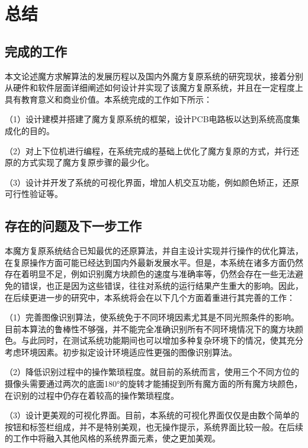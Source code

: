 
\chapter{总结}

\section{完成的工作}

本文论述魔方求解算法的发展历程以及国内外魔方复原系统的研究现状，接着分别从硬件和软件层面详细阐述如何设计并实现了该魔方复原系统，并且在一定程度上具有教育意义和商业价值。本系统完成的工作如下所示：

（1）设计建模并搭建了魔方复原系统的框架，设计PCB电路板以达到系统高度集成化的目的。

（2）对上下位机进行编程，在系统完成的基础上优化了魔方复原的方式，并行还原的方式实现了魔方复原步骤的最少化。

（3）设计并开发了系统的可视化界面，增加人机交互功能，例如颜色矫正，还原可行性验证等。

\section{存在的问题及下一步工作}

本魔方复原系统结合已知最优的还原算法，并自主设计实现并行操作的优化算法，在复原操作方面可能已经达到国内外最新发展水平。但是，本系统在诸多方面仍然存在着明显不足，例如识别魔方块颜色的速度与准确率等，仍然会存在一些无法避免的错误，也正是因为这些错误，往往对系统的运行结果产生重大的影响。因此，在后续更进一步的研究中，本系统将会在以下几个方面着重进行其完善的工作：

（1）完善图像识别算法，使系统免于不同环境因素尤其是不同光照条件的影响。目前本算法的鲁棒性不够强，并不能完全准确识别所有不同环境情况下的魔方块颜色。与此同时，在测试系统功能期间也可以增加多种复杂环境下的情况，使其充分考虑环境因素。初步拟定设计环境适应性更强的图像识别算法。

（2）降低识别过程中的操作繁琐程度。就目前的系统而言，使用三个不同方位的摄像头需要通过两次的底面180°的旋转才能捕捉到所有魔方面的所有魔方块颜色，在识别的过程中仍存在着较高的操作繁琐程度。

（3）设计更美观的可视化界面。目前，本系统的可视化界面仅仅是由数个简单的按钮和标签栏组成，并不是特别美观，也无操作提示，系统界面比较一般。在后续的工作中将融入其他风格的系统界面元素，使之更加美观。 

